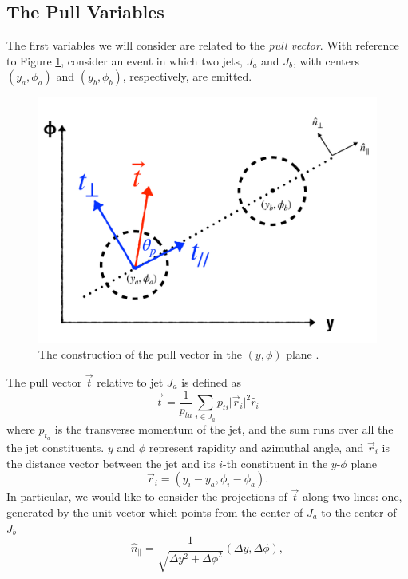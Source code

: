\documentclass[10pt,a4paper]{book}
\begin{document}
\subsection{The Pull Variables}
The first variables we will consider are related to the \emph{pull vector}. With reference to Figure \ref{Pull vector}, consider an event in which two jets, $J_a$ and $J_b$, with centers $(y_a, \phi_a)$ and $(y_b, \phi_b)$, respectively, are emitted.
\begin{figure}
\centering
\includegraphics[scale=0.3]{ch4_images/pull_components}
\caption{The construction of the pull vector in the $(y, \phi)$ plane \cite{Larkoski:2019fsm}.}
\label{Pull vector}
\end{figure}
The pull vector $\vec{t}$ relative to jet $J_a$ is defined as
\begin{equation}
\vec{t} = \frac{1}{p_{ta}} \sum_{i \in J_a}p_{ti}\vert \vec{r}_i \vert^2 \hat{r}_i
\end{equation}
where $p_{t_a}$ is the transverse momentum of the jet, and the sum runs over all the the jet constituents. $y$ and $\phi$ represent rapidity and azimuthal angle, and $\vec{r}_i$ is the distance vector between the jet and its $i$-th constituent in the $y$-$\phi$ plane
\begin{equation}
\vec{r}_i = (y_i - y_a, \phi_i - \phi_a).
\end{equation}
In particular, we would like to consider the projections of $\vec{t}$ along two lines: one, generated by the unit vector which points from the center of $J_a$ to the center of $J_b$
\begin{equation}
\hat{n}_\parallel = \frac{1}{\sqrt{\Delta y^2 + \Delta \phi^2}}\left(\Delta y, \Delta \phi \right),
\end{equation}
\end{document}

